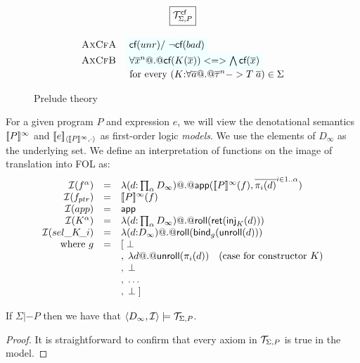 \documentclass[preprint,nocopyrightspace,draft]{sigplanconf}
\begin{document}
\begin{figure}
\[\begin{array}{c}
\begin{array}{lll}
\end{array} \\
\ruleform{\Th{\Sigma}{P}^{\lcfZ}} \\ \\ 
\begin{array}{lll} 
 \textsc{AxCfA}   & \formula{\lcf{\unr} /\ \lncf{\bad}} \\
 \textsc{AxCfB}   & \formula{\forall \oln{x}{n} @.@ \lcf{K(\ol{x})} <=> \bigwedge\lcf{\ol{x}}} \\
                  & \text{ for every } (K{:}\forall\as @.@ \oln{\tau}{n} -> T\;\as) \in \Sigma
\end{array}
\end{array}\]
\caption{Prelude theory}\label{fig:prelude}
\end{figure}


For a given program $P$ and expression $e$, we will view the denotational 
semantics $[\![P]\!]^{\infty}$ and $[\![e]\!]_{\langle {[\![P]\!]^\infty},{\cdot}\rangle}$ as first-order 
logic {\em models}. We use the elements of $D_{\infty}$ as the underlying set. We define
an interpretation of functions on the image of translation into FOL as: 
\[\begin{array}{rcl}
   {\cal I}(f^{\alpha})  & = & \mathsf{\lambda} (d {:} \prod_{\alpha}D_{\infty}) @.@ \mathsf{app}([\![P]\!]^{\infty}(f),\overline{\pi_i(d)}^{i \in 1..\alpha}) \\ 
   {\cal I}(f_{ptr})  & = & [\![P]\!]^{\infty}(f) \\ 
   {\cal I}(app)     & = & \mathsf{app} \\ 
   {\cal I}(K^{\alpha})  & = & \mathsf{\lambda} (d {:} \prod_{\alpha}D_{\infty}) @.@ \mathsf{roll}(\mathsf{ret}(\mathsf{inj}_{K}(d))) \\ 
   {\cal I}(\mathop{sel\_K\!\_i}) & = & \mathsf{\lambda} (d {:} D_{\infty}) @.@ \mathsf{roll}(\mathsf{bind}_g(\mathsf{unroll}(d))) \\ 
     \mbox{where } g  & = & [\;\bot \\ 
                      &   & ,\;\mathsf{\lambda} d @.@ \mathsf{unroll}(\pi_i(d))  \quad (\mbox{case for constructor } K) \\ 
                      &   & ,\;\bot \\ 
                      &   & ,\;\ldots\\ 
                      &   & ,\;\bot\; ]
\end{array}\]

\begin{theorem}
If $\Sigma |- P$ then we have that $\langle D_{\infty},{\cal I}\rangle \models {\cal T}_{\Sigma,P}$. 
\end{theorem} 
\begin{proof} It is straightforward to confirm that every axiom in ${\cal T}_{\Sigma,P}$ is true in the model. \end{proof}
\end{document}
